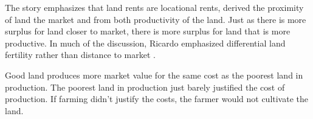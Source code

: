
The story emphasizes that land rents are locational rents, derived  the proximity of land the market and from both productivity of the land. %
Just as there is more surplus for land closer to market, there is more surplus for land that is more productive.  In much of the discussion, Ricardo emphasized differential land fertility rather than distance to market . 

Good land produces more market value for the same cost as the poorest land in production. The poorest land in production just barely justified the cost of production. If farming didn't justify the costs, the farmer would not cultivate the land. 

